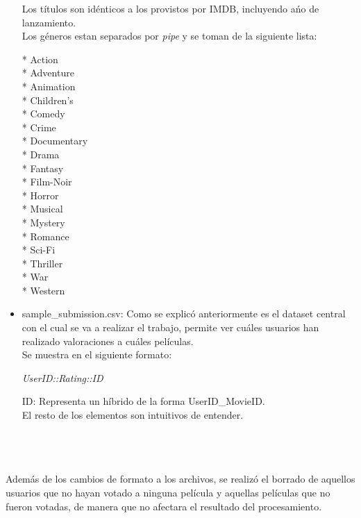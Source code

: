 \documentclass{sciposter}
\begin{document}
\begin{multicols}{3}
\begin{itemize}
Los t\'itulos son id\'enticos a los provistos por IMDB, incluyendo a\'no de lanzamiento.\\
Los g\'eneros estan separados por \emph{pipe} y se toman de la siguiente lista:
\begin{center}
	* Action\\
	* Adventure\\
	* Animation\\
	* Children's\\
	* Comedy\\
	* Crime\\
	* Documentary\\
	* Drama\\
	* Fantasy\\
	* Film-Noir\\
	* Horror\\
	* Musical\\
	* Mystery\\
	* Romance\\
	* Sci-Fi\\
	* Thriller\\
	* War\\
	* Western\\
\end{center} 

\item sample\_submission.csv: Como se explic\'o anteriormente es el dataset central con el cual se va a realizar el trabajo, permite ver cu\'ales usuarios han realizado valoraciones a cu\'ales pel\'iculas. \\
Se muestra en el siguiente formato:\\
\begin{center}
\emph{UserID::Rating::ID}
\end{center}
ID: Representa un h\'ibrido de la forma UserID\_MovieID.\\
El resto de los elementos son intuitivos de entender.\\\\\\\\
\end{itemize}

Adem\'as de los cambios de formato a los archivos, se realiz\'o el borrado de aquellos usuarios que no hayan votado a ninguna pel\'icula y  aquellas pel\'iculas que no fueron votadas, de manera que no afectara el resultado del procesamiento.



\end{multicols}
\end{document}
